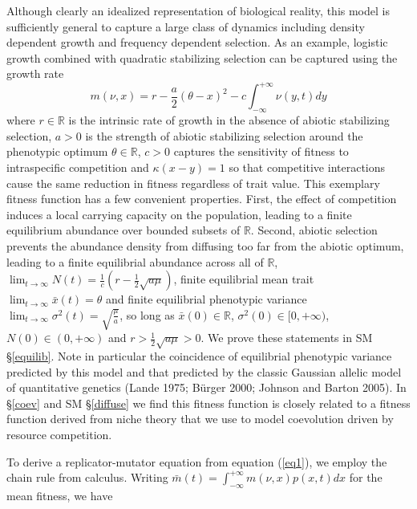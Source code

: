 \documentclass[]{article}
\begin{document}
Although clearly an idealized representation of biological reality, this
model is sufficiently general to capture a large class of dynamics
including density dependent growth and frequency dependent selection. As
an example, logistic growth combined with quadratic stabilizing
selection can be captured using the growth rate
\begin{equation}\label{special_m}
m(\nu,x)=r-\frac{a}{2}(\theta-x)^2-c\int_{-\infty}^{+\infty}\nu(y,t)dy
\end{equation} where \(r\in\mathbb{R}\) is the intrinsic rate of growth
in the absence of abiotic stabilizing selection, \(a>0\) is the strength
of abiotic stabilizing selection around the phenotypic optimum
\(\theta\in\mathbb{R}\), \(c>0\) captures the sensitivity of fitness to
intraspecific competition and \(\kappa(x-y)=1\) so that competitive
interactions cause the same reduction in fitness regardless of trait
value. This exemplary fitness function has a few convenient properties.
First, the effect of competition induces a local carrying capacity on
the population, leading to a finite equilibrium abundance over bounded
subsets of \(\mathbb{R}\). Second, abiotic selection prevents the
abundance density from diffusing too far from the abiotic optimum,
leading to a finite equilibrial abundance across all of \(\mathbb{R}\),
\(\lim_{t\to\infty}N(t)=\tfrac{1}{c}(r-\tfrac{1}{2}\sqrt{a\mu})\),
finite equilibrial mean trait \(\lim_{t\to\infty}\bar x(t)=\theta\) and
finite equilibrial phenotypic variance
\(\lim_{t\to\infty}\sigma^2(t)=\sqrt{\frac{\mu}{a}}\), so long as
\(\bar x(0)\in\mathbb{R}\), \(\sigma^2(0)\in[0,+\infty)\),
\(N(0)\in(0,+\infty)\) and \(r>\frac{1}{2}\sqrt{a\mu}>0\). We prove
these statements in SM \S\ref{equilib}. Note in particular the
coincidence of equilibrial phenotypic variance predicted by this model
and that predicted by the classic Gaussian allelic model of quantitative
genetics (Lande 1975; Bürger 2000; Johnson and Barton 2005). In
\S\ref{coev} and SM \S\ref{diffuse} we find this fitness function is
closely related to a fitness function derived from niche theory that we
use to model coevolution driven by resource competition.

To derive a replicator-mutator equation from equation (\ref{eq1}), we
employ the chain rule from calculus. Writing
\(\bar m(t)=\int_{-\infty}^{+\infty}m(\nu,x)p(x,t)dx\) for the mean
fitness, we have
\end{document}
